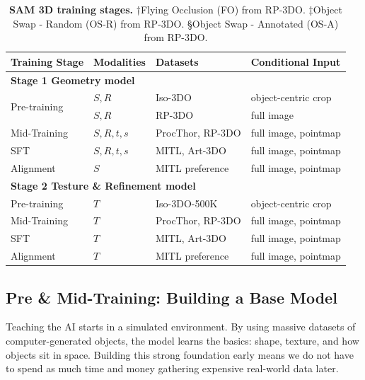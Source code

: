 \documentclass[manuscript,review]{acmart}
\begin{document}
\begin{table}[ht]
    \centering
    \begin{tabular}{l l l l}
    \hline
    \textbf{Training Stage} & \textbf{Modalities} & \textbf{Datasets} & \textbf{Conditional Input}  \\ \hline
    \multicolumn{4}{l}{\textbf{Stage 1 Geometry model}}\\ \hline
    \multirow{2}{*}{Pre-training} & $S, R$ & Iso-3DO & object-centric  crop\\
    & $S, R$ & RP-3DO & full image \\
    Mid-Training & $S, R, t, s$ & ProcThor, RP-3DO & full image, pointmap\\
    SFT & $S, R, t, s$ & MITL, Art-3DO  & full image, pointmap\\
    Alignment  & $S$ & MITL preference & full image, pointmap \\ \hline
    \multicolumn{4}{l}{\textbf{Stage 2 Testure \& Refinement model}}\\ \hline
    Pre-training & $T$ & Iso-3DO-500K & object-centric crop\\
    Mid-Training & $T$ & ProcThor, RP-3DO & full image, pointmap\\
    SFT & $T$ & MITL, Art-3DO  & full image, pointmap\\
    Alignment  & $T$ & MITL preference & full image, pointmap \\ \hline
    
    
    \end{tabular}
    \vspace{2\baselineskip}

    \caption{\textbf{SAM 3D training stages.} †Flying Occlusion (FO) from RP-3DO. ‡Object Swap - Random (OS-R) from RP-3DO. §Object
Swap - Annotated (OS-A) from RP-3DO.}
    \label{tab:training stages}
\end{table}

\subsection{Pre \& Mid-Training: Building a Base Model}

Teaching the AI starts in a simulated environment. By using massive datasets of computer-generated objects, the model learns the basics: shape, texture, and how objects sit in space. Building this strong foundation early means we do not have to spend as much time and money gathering expensive real-world data later. 
\end{document}
